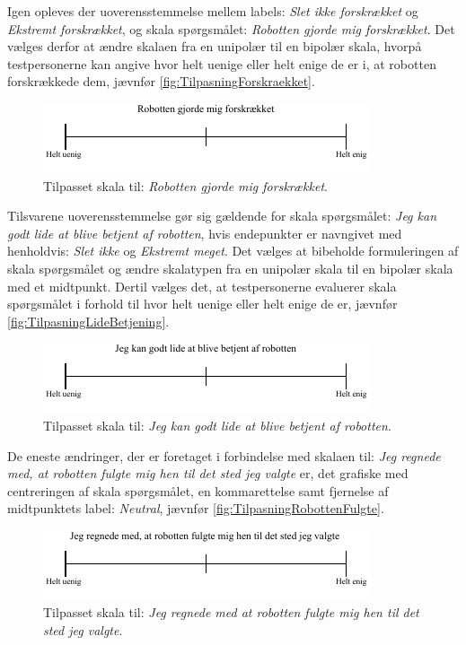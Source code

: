 Igen opleves der uoverensstemmelse mellem labels: \textit{Slet ikke forskrækket} og \textit{Ekstremt forskrækket}, og skala spørgsmålet: \textit{Robotten gjorde mig forskrækket}. Det vælges derfor at ændre skalaen fra en unipolær til en bipolær skala, hvorpå testpersonerne kan angive hvor helt uenige eller helt enige de er i, at robotten forskrækkede dem, jævnfør \autoref{fig:TilpasningForskraekket}.
%
\begin{figure}[H]
\centering
\includegraphics[width =\textwidth]{Figure/TilpasningAfSkalaer/TilpassetForskraekket} 
\caption{Tilpasset skala til: \textit{Robotten gjorde mig forskrækket}.}
\label{fig:TilpasningForskraekket}
\end{figure}
\noindent
% 
Tilsvarene uoverensstemmelse gør sig gældende for skala spørgsmålet: \textit{Jeg kan godt lide at blive betjent af robotten}, hvis endepunkter er navngivet med henholdvis: \textit{Slet ikke} og \textit{Ekstremt meget}. Det vælges at bibeholde formuleringen af skala spørgsmålet og ændre skalatypen fra en unipolær skala til en bipolær skala med et midtpunkt. Dertil vælges det, at testpersonerne evaluerer skala spørgsmålet i forhold til hvor helt uenige eller helt enige de er, jævnfør \autoref{fig:TilpasningLideBetjening}.   
%
\begin{figure}[H]
\centering
\includegraphics[width =\textwidth]{Figure/TilpasningAfSkalaer/TilpassetLideBetjening} 
\caption{Tilpasset skala til: \textit{Jeg kan godt lide at blive betjent af robotten}.}
\label{fig:TilpasningLideBetjening}
\end{figure}
\noindent
% 
De eneste ændringer, der er foretaget i forbindelse med skalaen til: \textit{Jeg regnede med, at robotten fulgte mig hen til det sted jeg valgte} er, det grafiske med centreringen af skala spørgsmålet, en kommarettelse samt fjernelse af midtpunktets label: \textit{Neutral}, jævnfør \autoref{fig:TilpasningRobottenFulgte}.
%
\begin{figure}[H]
\centering
\includegraphics[width =\textwidth]{Figure/TilpasningAfSkalaer/TilpassetRobottenFulgteMigDetRigtigeStedHen} 
\caption{Tilpasset skala til: \textit{Jeg regnede med at robotten fulgte mig hen til det sted jeg valgte}.}
\label{fig:TilpasningRobottenFulgte}
\end{figure}
